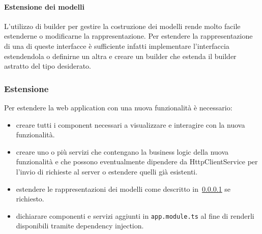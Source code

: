 \documentclass[../../manuale-manutentore.tex]{subfiles}
\begin{document}
\paragraph{Estensione dei modelli}%
\label{par:estensione_interfacce_webapp}

L'utilizzo di builder per gestire la costruzione dei modelli rende molto facile estenderne o modificarne la rappresentazione.
Per estendere la rappresentazione di una di queste interfacce è sufficiente infatti implementare l'interfaccia estendendola o definirne un altra e creare un builder che estenda il builder astratto del tipo desiderato.



\subsubsection{Estensione}%
\label{subs:estensione_webapp}

Per estendere la web application con una nuova funzionalità è necessario:

\begin{itemize}
  \item creare tutti i component necessari a visualizzare e interagire con la nuova funzionalità.
  \item creare uno o più servizi che contengano la business logic della nuova funzionalità e che possono eventualmente dipendere da HttpClientService per l'invio di richieste al server o estendere quelli già esistenti.
  \item estendere le rappresentazioni dei modelli come descritto in~\ref{par:estensione_interfacce_webapp} se richiesto.
  \item dichiarare componenti e servizi aggiunti in \texttt{app.module.ts} al fine di renderli disponibili tramite dependency injection.
\end{itemize}
\end{document}
